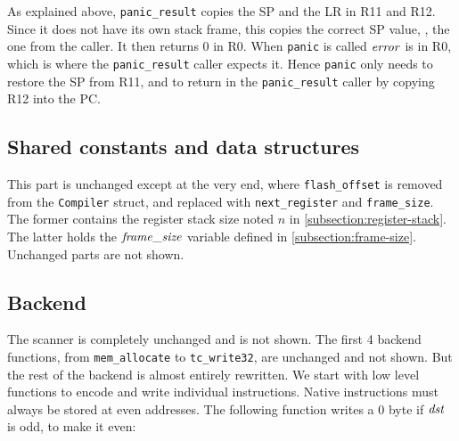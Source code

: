 As explained above, {\tt panic\_result} copies the SP and the LR in R11 and
R12. Since it does not have its own stack frame, this copies the correct SP
value, \ie, the one from the caller. It then returns 0 in R0. When {\tt panic}
is called $\it{error}$ is in R0, which is where the {\tt panic\_result} caller
expects it. Hence {\tt panic} only needs to restore the SP from R11, and to
return in the {\tt panic\_result} caller by copying R12 into the PC.


\subsection{Shared constants and data structures}

This part is unchanged except at the very end, where {\tt flash\_offset} is
removed from the {\tt Compiler} struct, and replaced with {\tt next\_register}
and {\tt frame\_size}. The former contains the register stack size noted $n$ in
\cref{subsection:register-stack}. The latter holds the $\it{frame\_size}$
variable defined in \cref{subsection:frame-size}. Unchanged parts are not
shown.



\subsection{Backend}


The scanner is completely unchanged and is not shown. The first 4 backend
functions, from {\tt mem\_allocate} to {\tt tc\_write32}, are unchanged and not
shown. But the rest of the backend is almost entirely rewritten. We start with
low level functions to encode and write individual instructions. Native
instructions must always be stored at even addresses. The following function
writes a 0 byte if $\it{dst}$ is odd, to make it even:

